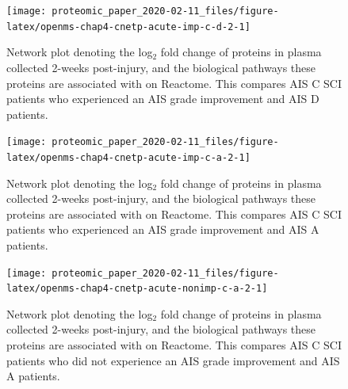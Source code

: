 \documentclass[9pt,lineno]{elife}
\begin{document}
\begin{landscape}



\begin{figure}

{\centering \texttt{[image: proteomic\_paper\_2020-02-11\_files/figure-latex/openms-chap4-cnetp-acute-imp-c-d-2-1]} 

}

\caption[Network plot - label-free - Acute C Improvers VS Acute D]{Network plot denoting the log\(_2\) fold change of proteins in plasma collected 2-weeks post-injury, and the biological pathways these proteins are associated with on Reactome. This compares AIS C SCI patients who experienced an AIS grade improvement and AIS D patients.}\label{fig:openms-chap4-cnetp-acute-imp-c-d-2}
\end{figure}

\end{landscape}
\begin{landscape}



\begin{figure}

{\centering \texttt{[image: proteomic\_paper\_2020-02-11\_files/figure-latex/openms-chap4-cnetp-acute-imp-c-a-2-1]} 

}

\caption[Network plot - label-free - Acute A VS Acute C Improvers]{Network plot denoting the log\(_2\) fold change of proteins in plasma collected 2-weeks post-injury, and the biological pathways these proteins are associated with on Reactome. This compares AIS C SCI patients who experienced an AIS grade improvement and AIS A patients.}\label{fig:openms-chap4-cnetp-acute-imp-c-a-2}
\end{figure}

\end{landscape}
\begin{landscape}



\begin{figure}

{\centering \texttt{[image: proteomic\_paper\_2020-02-11\_files/figure-latex/openms-chap4-cnetp-acute-nonimp-c-a-2-1]} 

}

\caption[Network plot - label-free - Acute A VS Acute C Non-Improvers]{Network plot denoting the log\(_2\) fold change of proteins in plasma collected 2-weeks post-injury, and the biological pathways these proteins are associated with on Reactome. This compares AIS C SCI patients who did not experience an AIS grade improvement and AIS A patients.}\label{fig:openms-chap4-cnetp-acute-nonimp-c-a-2}
\end{figure}

\end{landscape}
\end{document}
